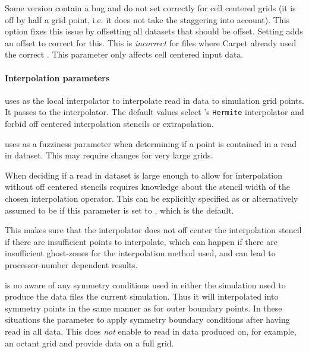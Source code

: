 Some  version contain a bug and do not set  correctly
for cell centered grids (it is off by half a grid point, i.e. it does not take
the staggering into account). This option fixes this issue by offsetting all
datasets that should be offset.  Setting 
adds an offset to correct for this. This is \emph{incorrect} for files where
Carpet already used the correct . This parameter only affects cell
centered input data.

\paragraph{Interpolation parameters}
 uses  as the local interpolator
to interpolate read in data to simulation grid points. It passes
 to the interpolator. The default values select
's \texttt{Hermite} interpolator and forbid off centered
interpolation stencils or extrapolation.

 uses  as a fuzziness
parameter when determining if a point is contained in a read in dataset. This
may require changes for very large grids.

When deciding if a read in dataset is large enough to allow for interpolation
without off centered stencils  requires knowledge about
the stencil width of the chosen interpolation operator. This can be explicitly
specified as  or alternatively
assumed to be  if this parameter is set to ,
which is the default.

This makes sure that the interpolator does not  off center the interpolation
stencil if there are insufficient points to interpolate, which can happen if
there are insufficient ghost-zones for the interpolation method used, and can
lead to processor-number dependent results.

 is no aware of any symmetry conditions used  in either
the simulation used to produce the data files the current simulation. Thus it
will interpolated into symmetry points in the same manner as for outer
boundary points. In these situations the parameter
 to apply symmetry boundary
conditions after having read in all data. This does \emph{not} enable
 to read in data produced on, for example, an octant
grid and provide data on a full grid.

